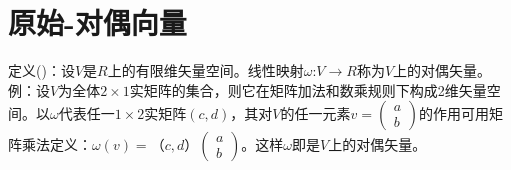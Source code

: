\documentclass[a4paper,12pt]{article}
\begin{document}
\section{原始-对偶向量}
定义(\cite{weifenjihe})：设$V$是$R$上的有限维矢量空间。线性映射$\omega$:$V\to R$称为$V$上的对偶矢量。
\\
例：设$V$为全体$2\times 1$实矩阵的集合，则它在矩阵加法和数乘规则下构成2维矢量空间。以$\omega$代表任一$1\times2$实矩阵$(c,d)$，其对$V$的任一元素$v=\left(\begin{array}{l}a\\b\end{array}\right)$的作用可用矩阵乘法定义：$\omega(v)=（c,d）\left(\begin{array}{l}a\\b\end{array}\right)$。这样$\omega$即是$V$上的对偶矢量。
\end{document}
